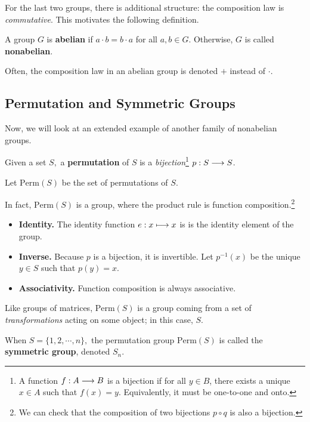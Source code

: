 For the last two groups, there is additional structure: the composition law is \emph{commutative}. This motivates the following definition.
\begin{definition}
A group $G$ is \textbf{abelian} if $a \cdot b = b \cdot a$ for all $a, b \in G.$ Otherwise, $G$ is called \textbf{nonabelian}.
\end{definition}

Often, the composition law in an abelian group is denoted $+$ instead of $\cdot.$


\subsection{Permutation and Symmetric Groups}
Now, we will look at an extended example of another family of nonabelian groups.

\begin{definition}
Given a set $S,$ a \textbf{permutation} of $S$ is a \emph{bijection}\footnote{A function $f: A \longrightarrow B$ is a bijection if for all $y \in B$, there exists a unique $x \in A$ such that $f(x) = y$. Equivalently, it must be one-to-one and onto.} $p: S \longrightarrow S$.
\end{definition}

\begin{definition}
Let $\text{Perm}(S)$ be the set of permutations of $S$. 
\end{definition}

In fact, $\text{Perm}(S)$ is a group, where the product rule is function composition.\footnote{We can check that the composition of two bijections $p \circ q$ is also a bijection.}
\begin{itemize}
    \item \textbf{Identity.} The identity function $e: x \longmapsto x$ is is the identity element of the group.
    
    \item \textbf{Inverse.} Because $p$ is a bijection, it is invertible. Let $p^{-1}(x)$ be the unique $y \in S$ such that $p(y) = x.$
    
    \item \textbf{Associativity.} Function composition is always associative.
\end{itemize}

Like groups of matrices, $\text{Perm}(S)$ is a group coming from a set of \emph{transformations} acting on some object; in this case, $S$. 

\begin{definition}
When $S = \{1, 2, \cdots, n\},$ the permutation group $\text{Perm}(S)$ is called the \textbf{symmetric group}, denoted $S_n.$
\end{definition}

